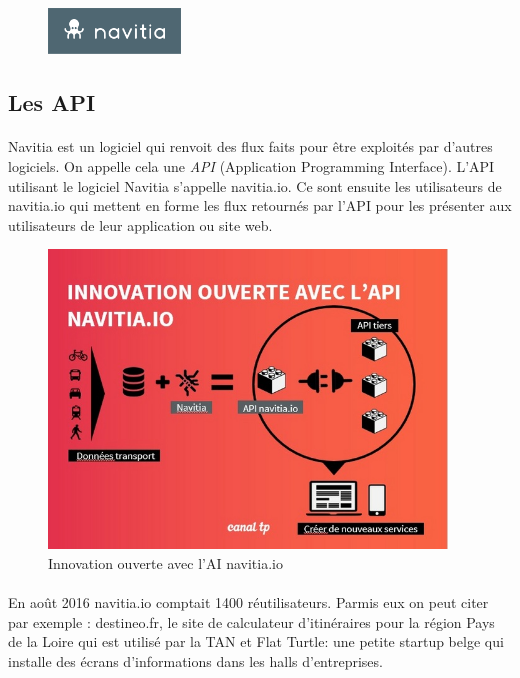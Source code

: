\documentclass[a4paper]{report}
\begin{document}
\begin{figure}[H] 
	\begin{center}
		\includegraphics[width=100pt]{image/logo_navitia}
	\end{center}
\end{figure}

\subsection{Les API} 
\paragraph{} Navitia est un logiciel qui renvoit des flux faits pour être exploités par d'autres logiciels. On appelle cela une  \emph{API} (Application Programming Interface). L'API utilisant le logiciel Navitia s'appelle navitia.io. Ce sont ensuite les utilisateurs de navitia.io qui mettent en forme les flux retournés par l'API pour les présenter aux utilisateurs de leur application ou site web. 

\begin{figure}[H] 
	\begin{center}
		\includegraphics[width=300pt]{image/API_navitia}
		\caption{Innovation ouverte avec l'AI navitia.io}
		\label{Innovation ouverte avec l'AI navitia.io}
	\end{center}
\end{figure}

\paragraph{} En août 2016 navitia.io comptait 1400 réutilisateurs. Parmis eux on peut citer par exemple : destineo.fr, le site de calculateur d'itinéraires pour la région Pays de la Loire qui est utilisé par la TAN et Flat Turtle: une petite startup belge qui installe des écrans d’informations dans les halls d’entreprises. 
\end{document}
